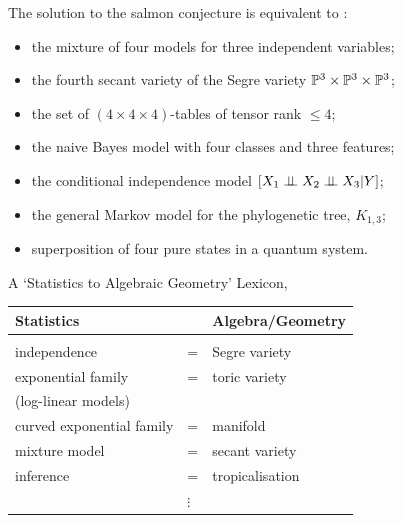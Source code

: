 \begin{frame}

The solution to the salmon conjecture is equivalent to \cite{BS2009}:
    \begin{itemize}
        \item the mixture of four models for three independent variables;
        \item the fourth secant variety of the Segre variety $\mathbb{P}^{3} \times \mathbb{P}^{3} \times \mathbb{P}^{3}$;
        \item the set of $(4 \times 4 \times 4)$-tables of tensor rank $\leq 4$;
        \item the naive Bayes model with four classes and three features;
        \item the conditional independence model $[ X_{1} \perp \!\!\! \perp X_{2} \perp \!\!\! \perp X_{3} | Y ]$;
        \item the general Markov model for the phylogenetic tree, $K_{1,3}$;
        \item superposition of four pure states in a quantum system.
    \end{itemize}

\end{frame}

\begin{frame}

    \begin{block}{A `Statistics to Algebraic Geometry' Lexicon, \cite{BSLP2005}}

    \begin{table}[]
    \begin{tabular}{lll}
    Statistics                &   & Algebra/Geometry \\ \hline
                              &   &                  \\ 
    independence              & = & Segre variety    \\ 
    exponential family        & = & toric variety    \\ 
    (log-linear models)       &   &                  \\ 
    curved exponential family & = & manifold         \\ 
    mixture model             & = & secant variety   \\
    inference                 & = & tropicalisation  \\
                              & $\vdots$ &           
    \end{tabular}
    \end{table}

    \end{block}

\end{frame}

